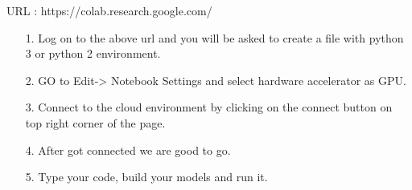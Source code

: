 URL : {https://colab.research.google.com/}
\begin{itemize}
\item[1.] Log on to the above url and you will be asked to create a file with python 3 or python 2 environment. 
\item[2.] GO to Edit-> Notebook Settings and select hardware accelerator as GPU.
\item[3.] Connect to the cloud environment by clicking on the connect button on top right corner of the page.
\item[4.] After got connected we are good to go.
\item[5.] Type your code, build your models and run it.
\end{itemize}



